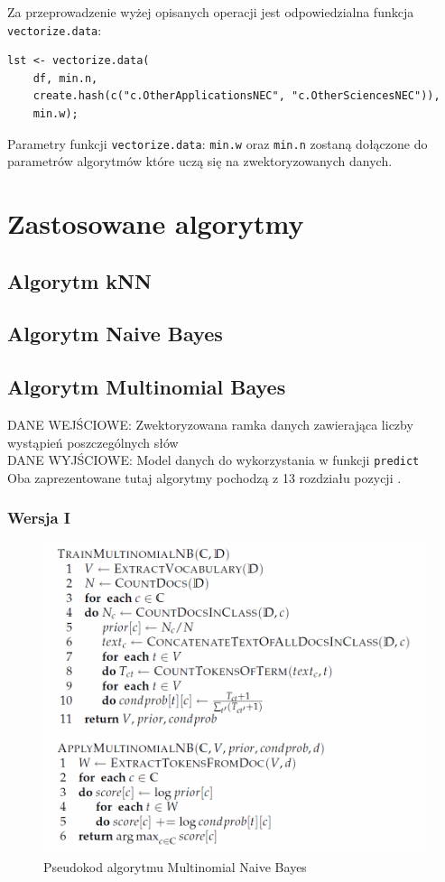 \documentclass[a4paper,12pt]{article}
\begin{document}
		Za przeprowadzenie wyżej opisanych operacji jest
		odpowiedzialna funkcja \texttt{vectorize.data}:
		\begin{verbatim}
lst <- vectorize.data(
    df, min.n, 
    create.hash(c("c.OtherApplicationsNEC", "c.OtherSciencesNEC")),
    min.w);
		\end{verbatim}
		
		Parametry funkcji \texttt{vectorize.data}: \texttt{min.w} oraz
		\texttt{min.n} zostaną dołączone do parametrów algorytmów
		które uczą się na zwektoryzowanych danych.

\section{Zastosowane algorytmy}
	\subsection{Algorytm kNN}
	\subsection{Algorytm Naive Bayes}
	
	\subsection{Algorytm Multinomial Bayes}	
		\textsc{DANE WEJŚCIOWE}: Zwektoryzowana ramka danych zawierająca
		liczby wystąpień poszczególnych słów\\
		\textsc{DANE WYJŚCIOWE}: Model danych do wykorzystania w funkcji
		\texttt{predict}\\	
		
		Oba zaprezentowane tutaj algorytmy pochodzą z
		13 rozdziału pozycji \cite{irbook}.
	
		\subsubsection{Wersja I}
		\begin{figure}[!h]
			\centering
			\includegraphics[scale=0.45]{./img/mnbalg}
			\caption{Pseudokod algorytmu Multinomial Naive Bayes}
		\end{figure}
		
\end{document}
